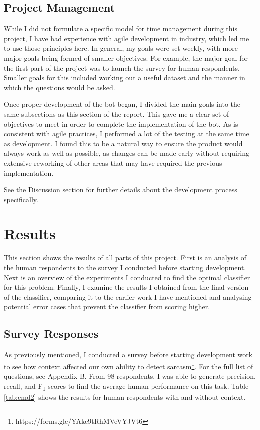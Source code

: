 \documentclass[a4paper,12pt]{article}
\begin{document}
\subsection{Project Management}
While I did not formulate a specific model for time management during this project, I have had experience with agile development in industry, which led me to use those principles here. In general, my goals were set weekly, with more major goals being formed of smaller objectives. For example, the major goal for the first part of the project was to launch the survey for human respondents. Smaller goals for this included working out a useful dataset and the manner in which the questions would be asked.

Once proper development of the bot began, I divided the main goals into the same subsections as this section of the report. This gave me a clear set of objectives to meet in order to complete the implementation of the bot. As is consistent with agile practices, I performed a lot of the testing at the same time as development. I found this to be a natural way to ensure the product would always work as well as possible, as changes can be made early without requiring extensive reworking of other areas that may have required the previous implementation.

See the Discussion section for further details about the development process specifically.

\section{Results}
This section shows the results of all parts of this project. First is an analysis of the human respondents to the survey I conducted before starting development. Next is an overview of the experiments I conducted to find the optimal classifier for this problem. Finally, I examine the results I obtained from the final version of the classifier, comparing it to the earlier work I have mentioned and analysing potential error cases that prevent the classifier from scoring higher.

\subsection{Survey Responses}
As previously mentioned, I conducted a survey before starting development work to see how context affected our own ability to detect sarcasm\footnote{https://forms.gle/YAkc9tRhMVeVYJVt6}. For the full list of questions, see Appendix B. From 98 respondents, I was able to generate precision, recall, and F\textsubscript{1} scores to find the average human performance on this task. Table \ref{tab:cmd2} shows the results for human respondents with and without context.
\end{document}
